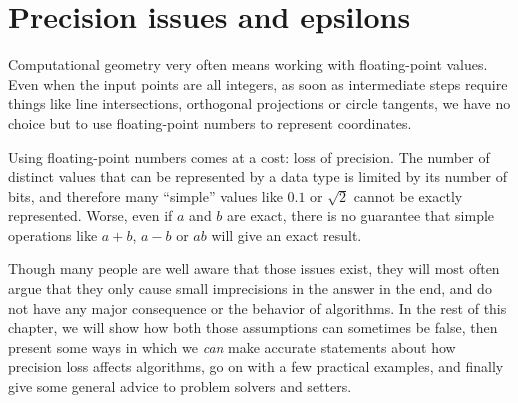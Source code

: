 \chapter{Precision issues and epsilons}

Computational geometry very often means working with floating-point values. Even when the input points are all integers, as soon as intermediate steps require things like line intersections, orthogonal projections or circle tangents, we have no choice but to use floating-point numbers to represent coordinates.

Using floating-point numbers comes at a cost: loss of precision. The number of distinct values that can be represented by a data type is limited by its number of bits, and therefore many ``simple'' values like $0.1$ or $\sqrt{2}$ cannot be exactly represented. Worse, even if $a$ and $b$ are exact, there is no guarantee that simple operations like $a+b$, $a-b$ or $ab$ will give an exact result.

Though many people are well aware that those issues exist, they will most often argue that they only cause small imprecisions in the answer in the end, and do not have any major consequence or the behavior of algorithms. In the rest of this chapter, we will show how both those assumptions can sometimes be false, then present some ways in which we \emph{can} make accurate statements about how precision loss affects algorithms, go on with a few practical examples, and finally give some general advice to problem solvers and setters.






